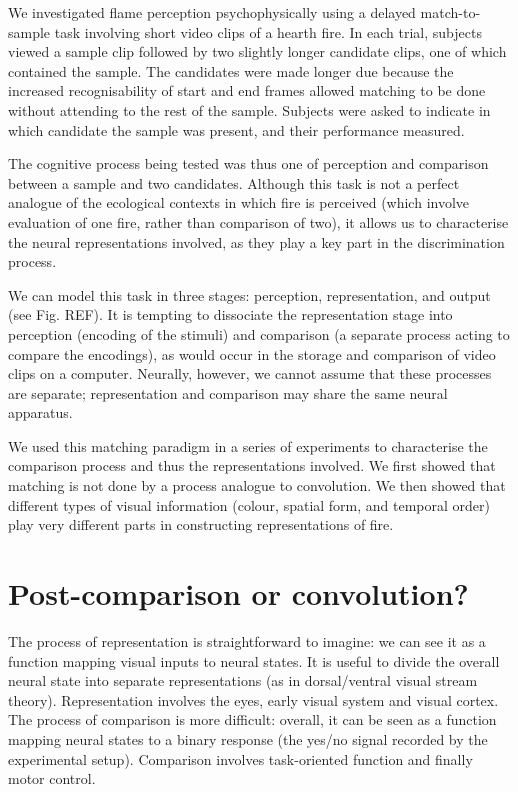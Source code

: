 \documentclass{jov}
\begin{document}
We investigated flame perception psychophysically using a delayed match-to-sample task involving short video clips of a hearth fire. In each trial, subjects viewed a sample clip followed by two slightly longer candidate clips, one of which contained the sample. The candidates were made longer due because the increased recognisability of start and end frames allowed matching to be done without attending to the rest of the sample. Subjects were asked to indicate in which candidate the sample was present, and their performance measured.

The cognitive process being tested was thus one of perception and comparison between a sample and two candidates. Although this task is not a perfect analogue of the ecological contexts in which fire is perceived (which involve evaluation of one fire, rather than comparison of two), it allows us to characterise the neural representations involved, as they play a key part in the discrimination process.

We can model this task in three stages: perception, representation, and output (see Fig. REF). It is tempting to dissociate the representation stage into perception (encoding of the stimuli) and comparison (a separate process acting to compare the encodings), as would occur in the storage and comparison of video clips on a computer. Neurally, however, we cannot assume that these processes are separate; representation and comparison may share the same neural apparatus.

We used this matching paradigm in a series of experiments to characterise the comparison process and thus the representations involved. We first showed that matching is not done by a process analogue to convolution. We then showed that different types of visual information (colour, spatial form, and temporal order) play very different parts in constructing representations of fire.

\section{Post-comparison or convolution?}

The process of representation is straightforward to imagine: we can see it as a function mapping visual inputs to neural states. It is useful to divide the overall neural state into separate representations (as in dorsal/ventral visual stream theory). Representation involves the eyes, early visual system and visual cortex. The process of comparison is more difficult: overall, it can be seen as a function mapping neural states to a binary response (the yes/no signal recorded by the experimental setup). Comparison involves task-oriented function and finally motor control.
\end{document}
